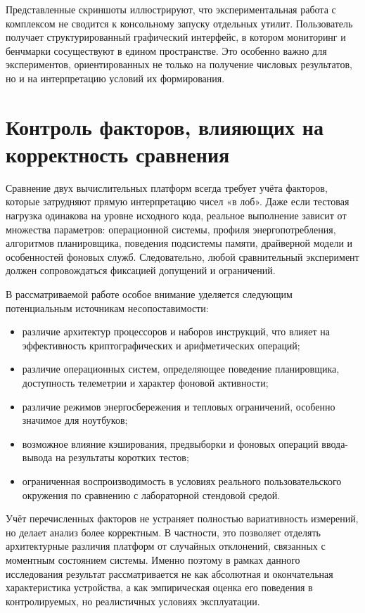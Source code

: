 Представленные скриншоты иллюстрируют, что экспериментальная работа с комплексом не сводится к консольному запуску отдельных утилит. Пользователь получает структурированный графический интерфейс, в котором мониторинг и бенчмарки сосуществуют в едином пространстве. Это особенно важно для экспериментов, ориентированных не только на получение числовых результатов, но и на интерпретацию условий их формирования.

\section{Контроль факторов, влияющих на корректность сравнения}

Сравнение двух вычислительных платформ всегда требует учёта факторов, которые затрудняют прямую интерпретацию чисел «в лоб». Даже если тестовая нагрузка одинакова на уровне исходного кода, реальное выполнение зависит от множества параметров: операционной системы, профиля энергопотребления, алгоритмов планировщика, поведения подсистемы памяти, драйверной модели и особенностей фоновых служб. Следовательно, любой сравнительный эксперимент должен сопровождаться фиксацией допущений и ограничений.

В рассматриваемой работе особое внимание уделяется следующим потенциальным источникам несопоставимости:
\begin{itemize}
    \item различие архитектур процессоров и наборов инструкций, что влияет на эффективность криптографических и арифметических операций;
    \item различие операционных систем, определяющее поведение планировщика, доступность телеметрии и характер фоновой активности;
    \item различие режимов энергосбережения и тепловых ограничений, особенно значимое для ноутбуков;
    \item возможное влияние кэширования, предвыборки и фоновых операций ввода-вывода на результаты коротких тестов;
    \item ограниченная воспроизводимость в условиях реального пользовательского окружения по сравнению с лабораторной стендовой средой.
\end{itemize}

Учёт перечисленных факторов не устраняет полностью вариативность измерений, но делает анализ более корректным. В частности, это позволяет отделять архитектурные различия платформ от случайных отклонений, связанных с моментным состоянием системы. Именно поэтому в рамках данного исследования результат рассматривается не как абсолютная и окончательная характеристика устройства, а как эмпирическая оценка его поведения в контролируемых, но реалистичных условиях эксплуатации.

